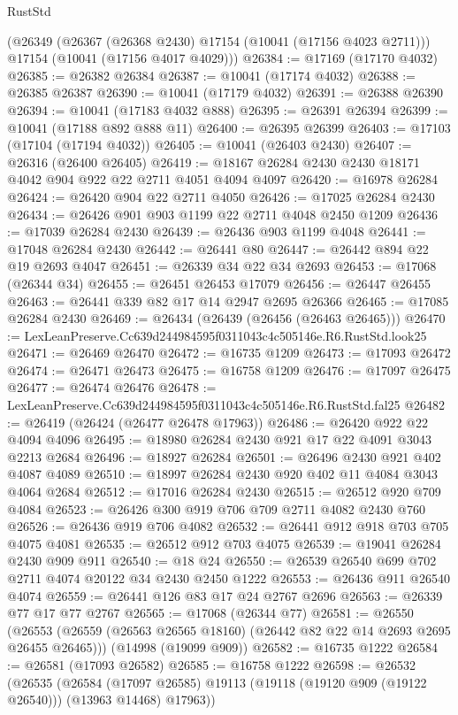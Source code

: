 \begin{lexlean}{RustStd}
\begin{coremodule}
    (@26349
      (@26367 (@26368 @2430) @17154 (@10041 (@17156 @4023 @2711)))
      @17154
      (@10041 (@17156 @4017 @4029)))
@26384 := @17169 (@17170 @4032)
@26385 := @26382 @26384
@26387 := @10041 (@17174 @4032)
@26388 := @26385 @26387
@26390 := @10041 (@17179 @4032)
@26391 := @26388 @26390
@26394 := @10041 (@17183 @4032 @888)
@26395 := @26391 @26394
@26399 := @10041 (@17188 @892 @888 @11)
@26400 := @26395 @26399
@26403 := @17103 (@17104 (@17194 @4032))
@26405 := @10041 (@26403 @2430)
@26407 := @26316 (@26400 @26405)
@26419 := @18167 @26284 @2430 @2430 @18171 @4042 @904 @922 @22 @2711 @4051 @4094 @4097
@26420 := @16978 @26284
@26424 := @26420 @904 @22 @2711 @4050
@26426 := @17025 @26284 @2430
@26434 := @26426 @901 @903 @1199 @22 @2711 @4048 @2450 @1209
@26436 := @17039 @26284 @2430
@26439 := @26436 @903 @1199 @4048
@26441 := @17048 @26284 @2430
@26442 := @26441 @80
@26447 := @26442 @894 @22 @19 @2693 @4047
@26451 := @26339 @34 @22 @34 @2693
@26453 := @17068 (@26344 @34)
@26455 := @26451 @26453 @17079
@26456 := @26447 @26455
@26463 := @26441 @339 @82 @17 @14 @2947 @2695 @26366
@26465 := @17085 @26284 @2430
@26469 := @26434 (@26439 (@26456 (@26463 @26465)))
@26470 := LexLeanPreserve.Cc639d244984595f0311043c4c505146e.R6.RustStd.look25
@26471 := @26469 @26470
@26472 := @16735 @1209
@26473 := @17093 @26472
@26474 := @26471 @26473
@26475 := @16758 @1209
@26476 := @17097 @26475
@26477 := @26474 @26476
@26478 := LexLeanPreserve.Cc639d244984595f0311043c4c505146e.R6.RustStd.fal25
@26482 := @26419 (@26424 (@26477 @26478 @17963))
@26486 := @26420 @922 @22 @4094 @4096
@26495 := @18980 @26284 @2430 @921 @17 @22 @4091 @3043 @2213 @2684
@26496 := @18927 @26284
@26501 := @26496 @2430 @921 @402 @4087 @4089
@26510 := @18997 @26284 @2430 @920 @402 @11 @4084 @3043 @4064 @2684
@26512 := @17016 @26284 @2430
@26515 := @26512 @920 @709 @4084
@26523 := @26426 @300 @919 @706 @709 @2711 @4082 @2430 @760
@26526 := @26436 @919 @706 @4082
@26532 := @26441 @912 @918 @703 @705 @4075 @4081
@26535 := @26512 @912 @703 @4075
@26539 := @19041 @26284 @2430 @909 @911
@26540 := @18 @24
@26550 := @26539 @26540 @699 @702 @2711 @4074 @20122 @34 @2430 @2450 @1222
@26553 := @26436 @911 @26540 @4074
@26559 := @26441 @126 @83 @17 @24 @2767 @2696
@26563 := @26339 @77 @17 @77 @2767
@26565 := @17068 (@26344 @77)
@26581 := @26550
    (@26553 (@26559 (@26563 @26565 @18160) (@26442 @82 @22 @14 @2693 @2695 @26455 @26465)))
    (@14998 (@19099 @909))
@26582 := @16735 @1222
@26584 := @26581 (@17093 @26582)
@26585 := @16758 @1222
@26598 := @26532
    (@26535
      (@26584 (@17097 @26585) @19113 (@19118 (@19120 @909 (@19122 @26540))) (@13963 @14468) @17963))

\end{coremodule}
\end{lexlean}
